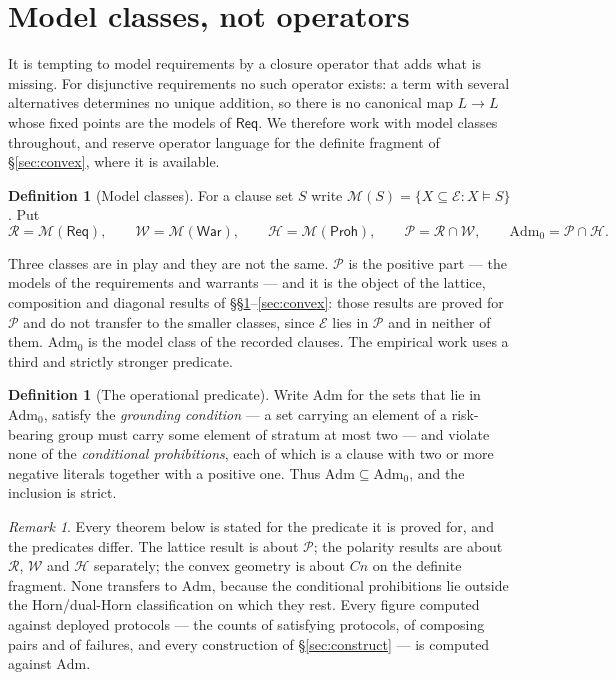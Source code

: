 \documentclass[11pt,reqno]{amsart}
\theoremstyle{plain}
\theoremstyle{definition}
\newtheorem{definition}[theorem]{Definition}
\theoremstyle{remark}
\newtheorem{remark}[theorem]{Remark}
\newcommand{\Pos}{\mathcal{P}}
\newcommand{\Adm}{\mathrm{Adm}_{0}}
\newcommand{\Admf}{\mathrm{Adm}}
\newcommand{\El}{\mathcal{E}}
\newcommand{\Law}{\mathsf{Req}}
\newcommand{\Haz}{\mathsf{Proh}}
\newcommand{\War}{\mathsf{War}}
\begin{document}
\section{Model classes, not operators}\label{sec:models}

It is tempting to model requirements by a closure operator that adds what is
missing. For disjunctive requirements no such operator exists: a term with
several alternatives determines no unique addition, so there is no canonical
map $L \to L$ whose fixed points are the models of $\Law$. We therefore work with
model classes throughout, and reserve operator language for the definite fragment
of \S\ref{sec:convex}, where it is available.

\begin{definition}[Model classes]
For a clause set $S$ write $\mathcal{M}(S) = \{X \subseteq \El : X \models S\}$.
Put
\[
  \mathcal{R} = \mathcal{M}(\Law), \qquad
  \mathcal{W} = \mathcal{M}(\War), \qquad
  \mathcal{H} = \mathcal{M}(\Haz), \qquad
    \Pos = \mathcal{R} \cap \mathcal{W}, \qquad
    \Adm = \Pos \cap \mathcal{H}.
\]
\end{definition}

Three classes are in play and they are not the same. $\Pos$ is the positive
part --- the models of the requirements and warrants --- and it is the object of
the lattice, composition and diagonal results of
\S\S\ref{sec:models}--\ref{sec:convex}: those results are proved for $\Pos$
and do not transfer to the smaller classes, since $\El$ lies in $\Pos$ and in
neither of them. $\Adm$ is the model class of the recorded clauses. The
empirical work uses a third and strictly stronger predicate.

\begin{definition}[The operational predicate]\label{def:admfull}
Write $\Admf$ for the sets that lie in $\Adm$, satisfy the \emph{grounding
condition} --- a set carrying an element of a risk-bearing group must carry some
element of stratum at most two --- and violate none of the \emph{conditional
prohibitions}, each of which is a clause with two or more negative literals
together with a positive one. Thus $\Admf \subseteq \Adm$, and the inclusion is
strict.
\end{definition}

\begin{remark}
Every theorem below is stated for the predicate it is proved for, and the
predicates differ. The lattice result is about $\Pos$; the polarity results are
about $\mathcal{R}$, $\mathcal{W}$ and $\mathcal{H}$ separately; the convex
geometry is about $Cn$ on the definite fragment. None transfers to $\Admf$,
because the conditional prohibitions lie outside the Horn/dual-Horn
classification on which they rest. Every figure computed against
deployed protocols --- the counts of satisfying protocols, of composing pairs
and of failures, and every construction of \S\ref{sec:construct} --- is computed
against $\Admf$.
\end{remark}
\end{document}
